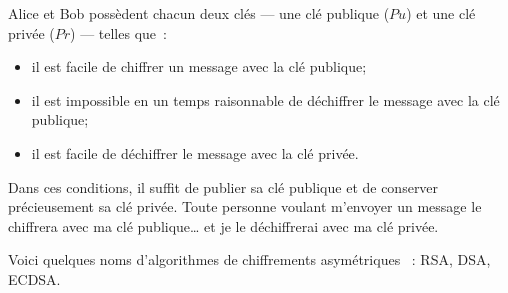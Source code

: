 \documentclass[a4paper,11pt]{article}
\begin{document}
\begin{center}
\end{center}

\vspace{2cm}


Alice et Bob possèdent chacun deux clés — une clé publique ($Pu$) et une clé 
privée ($Pr$) — telles que~:

\begin{itemize}
	\item il est facile de chiffrer un message avec la clé publique;

	\item il est impossible en un temps raisonnable de déchiffrer le
		message avec la clé publique;

	\item il est facile de déchiffrer le message avec la clé privée.
\end{itemize}

Dans ces conditions, il suffit de publier sa clé publique et de conserver
précieusement sa clé privée. Toute personne voulant m'envoyer un message le
chiffrera avec ma clé publique… et je le déchiffrerai avec ma clé privée. 


Voici quelques noms d'algorithmes de chiffrements asymétriques
~: RSA, DSA, ECDSA. 
	
\end{document}

